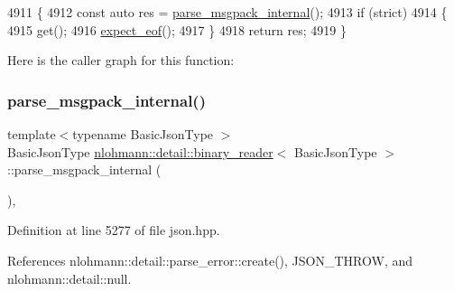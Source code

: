 \begin{DoxyCode}
4911     \{
4912         \textcolor{keyword}{const} \textcolor{keyword}{auto} res = \hyperlink{classnlohmann_1_1detail_1_1binary__reader_ac6dc6270ddddd0aac65fe6cab53d7cc2}{parse\_msgpack\_internal}();
4913         \textcolor{keywordflow}{if} (strict)
4914         \{
4915             \textcolor{keyword}{get}();
4916             \hyperlink{classnlohmann_1_1detail_1_1binary__reader_ad0eebfcfd82778a76e1ae72dec49c25f}{expect\_eof}();
4917         \}
4918         \textcolor{keywordflow}{return} res;
4919     \}
\end{DoxyCode}
Here is the caller graph for this function\+:
\mbox{\label{classnlohmann_1_1detail_1_1binary__reader_ac6dc6270ddddd0aac65fe6cab53d7cc2}} 
\subsubsection{\texorpdfstring{parse\+\_\+msgpack\+\_\+internal()}{parse\_msgpack\_internal()}}
{\footnotesize\ttfamily template$<$typename Basic\+Json\+Type $>$ \\
Basic\+Json\+Type \hyperlink{classnlohmann_1_1detail_1_1binary__reader}{nlohmann\+::detail\+::binary\+\_\+reader}$<$ Basic\+Json\+Type $>$\+::parse\+\_\+msgpack\+\_\+internal (\begin{DoxyParamCaption}{ }\end{DoxyParamCaption})\hspace{0.3cm}{\ttfamily [inline]}, {\ttfamily [private]}}



Definition at line 5277 of file json.\+hpp.



References nlohmann\+::detail\+::parse\+\_\+error\+::create(), J\+S\+O\+N\+\_\+\+T\+H\+R\+OW, and nlohmann\+::detail\+::null.


